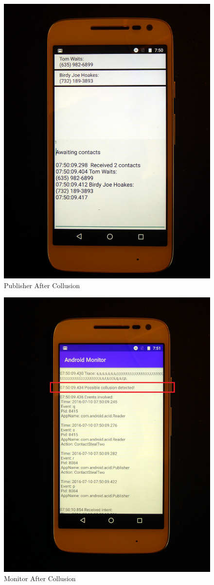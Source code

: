 \begin{figure}[h!]
	\centering
	\includegraphics[width=0.7\linewidth]{graphics/PhonePhotos/08 - PublisherAfter.jpg}
	\caption{Publisher After Collusion}
	\label{fig:PublisherAfter}
\end{figure}

\newpage

\begin{figure}[h!]
   \centering
   \includegraphics[width=0.7\linewidth]{graphics/PhonePhotos/09 - MonitorAfter.jpg}
   \caption{Monitor After Collusion}
   \label{fig:MonitorAfter}
\end{figure}

